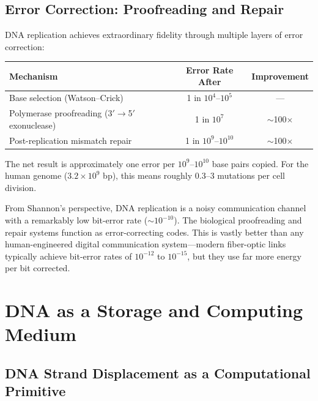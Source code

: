 \subsection{Error Correction: Proofreading and Repair}

DNA replication achieves extraordinary fidelity through multiple layers of error correction:

\begin{center}
\renewcommand{\arraystretch}{1.15}
\begin{tabular}{lcc}
\toprule
\textbf{Mechanism} & \textbf{Error Rate After} & \textbf{Improvement} \\
\midrule
Base selection (Watson--Crick) & 1 in $10^4$--$10^5$ & --- \\
Polymerase proofreading (3$'$$\to$5$'$ exonuclease) & 1 in $10^7$ & $\sim$100$\times$ \\
Post-replication mismatch repair & 1 in $10^9$--$10^{10}$ & $\sim$100$\times$ \\
\bottomrule
\end{tabular}
\end{center}

The net result is approximately one error per $10^9$--$10^{10}$ base pairs copied. For the human genome ($3.2 \times 10^9$ bp), this means roughly 0.3--3 mutations per cell division.

\begin{bioinsight}
From Shannon's perspective, DNA replication is a noisy communication channel with a remarkably low bit-error rate ($\sim$$10^{-10}$). The biological proofreading and repair systems function as error-correcting codes. This is vastly better than any human-engineered digital communication system---modern fiber-optic links typically achieve bit-error rates of $10^{-12}$ to $10^{-15}$, but they use far more energy per bit corrected.
\end{bioinsight}

\section{DNA as a Storage and Computing Medium}
\label{sec:dna-storage-computing}

\subsection{DNA Strand Displacement as a Computational Primitive}

